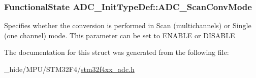 \subsubsection[{A\+D\+C\+\_\+\+Scan\+Conv\+Mode}]{\setlength{\rightskip}{0pt plus 5cm}Functional\+State A\+D\+C\+\_\+\+Init\+Type\+Def\+::\+A\+D\+C\+\_\+\+Scan\+Conv\+Mode}\label{struct_a_d_c___init_type_def_aaf44f54f22ab40bf8fae01f075aa4c87}
Specifies whether the conversion is performed in Scan (multichannels) or Single (one channel) mode. This parameter can be set to E\+N\+A\+B\+L\+E or D\+I\+S\+A\+B\+L\+E 

The documentation for this struct was generated from the following file\+:\begin{DoxyCompactItemize}
\item 
\+\_\+hide/\+M\+P\+U/\+S\+T\+M32\+F4/\hyperlink{stm32f4xx__adc_8h}{stm32f4xx\+\_\+adc.\+h}\end{DoxyCompactItemize}
